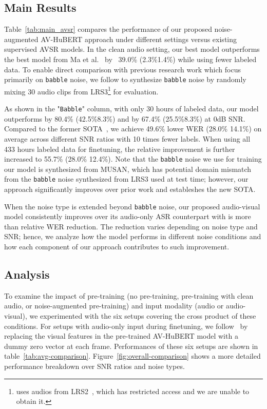  \subsection{Main Results}
Table~\ref{tab:main_avsr} compares the performance of our proposed noise-augmented AV-HuBERT approach under different settings versus existing supervised AVSR models. In the clean audio setting, our best model outperforms the best model from Ma et al.~\cite{ma2021conformer} by ~39.0\% (2.3\%1.4\%) while using fewer labeled data. To enable direct comparison with previous research work which focus primarily on \texttt{babble} noise, we follow \cite{Xu2020DiscriminativeMS} to synthesize \texttt{babble} noise by randomly mixing 30 audio clips from LRS3\footnote{\cite{afouras2018deepavsr} uses audios from LRS2~\cite{afouras2018deepavsr}, which has restricted access and we are unable to obtain it.} for evaluation.

As shown in the "\texttt{Babble}" column, with only 30 hours of labeled data, our model outperforms \cite{afouras2018deepavsr} by 80.4\% (42.5\%8.3\%) and \cite{Xu2020DiscriminativeMS} by 67.4\% (25.5\%8.3\%) at 0dB SNR. Compared to the former SOTA~\cite{Xu2020DiscriminativeMS}, we achieve 49.6\% lower WER (28.0\%  14.1\%) on average across different SNR ratios with 10 times fewer labels. When using all 433 hours labeled data for finetuning, the relative improvement is further increased to 55.7\% (28.0\%  12.4\%). Note that the \texttt{babble} noise we use for training our model is synthesized from MUSAN, which has potential domain mismatch from the \texttt{babble} noise synthesized from LRS3 used at test time; however, our approach significantly improves over prior work and estableshes the new SOTA.

When the noise type is extended beyond \texttt{babble} noise, our proposed audio-visual model consistently improves over its audio-only ASR counterpart with is more than  relative WER reduction. The reduction varies depending on noise type and SNR; hence, we analyze how the model performs in different noise conditions and how each component of our approach contributes to such improvement.


\subsection{Analysis}
To examine the impact of pre-training (no pre-training, pre-training with clean audio, or noise-augmented pre-training) and input modality (audio or audio-visual), we experimented with the six setups covering the cross product of these conditions. For setups with audio-only input during finetuning, we follow~\cite{avhubert} by replacing the visual features in the pre-trained AV-HuBERT model with a dummy zero vector at each frame. Performances of these six setups are shown in table~\ref{tab:avg-comparison}. Figure~\ref{fig:overall-comparison} shows a more detailed performance breakdown over SNR ratios and noise types.


